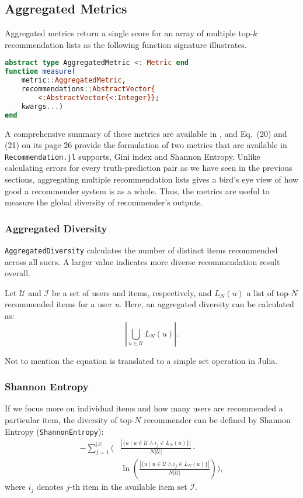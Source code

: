 \subsection{Aggregated Metrics}

Aggregated metrics return a single score for an array of multiple top-$k$ recommendation lists as the following function signature illustrates. 

\begin{lstlisting}[language = Julia]
abstract type AggregatedMetric <: Metric end
function measure(
    metric::AggregatedMetric, 
    recommendations::AbstractVector{
        <:AbstractVector{<:Integer}}; 
    kwargs...)
end
\end{lstlisting}

A comprehensive summary of these metrics are available in \cite{shani2011evaluating}, and Eq.~(20) and (21) on its page 26 provide the formulation of two metrics that are available in \texttt{Recommendation.jl} supports, Gini index and Shannon Entropy. Unlike calculating errors for every truth-prediction pair as we have seen in the previous sections, aggregating multiple recommendation lists gives a bird's eye view of how good a recommender system is as a whole. Thus, the metrics are useful to measure the global diversity of recommender's outputs.

\subsubsection{Aggregated Diversity}

\texttt{AggregatedDiversity} calculates the number of distinct items recommended across all suers. A larger value indicates more diverse recommendation result overall.

Let $\mathcal{U}$ and $\mathcal{I}$ be a set of users and items, respectively, and $L_N(u)$ a list of top-$N$ recommended items for a user $u$. Here, an aggregated diversity can be calculated as:
\begin{equation*}
\left| \bigcup\limits_{u \in \mathcal{U}} L_N(u) \right|.
\end{equation*}

Not to mention the equation is translated to a simple set operation in Julia.

\subsubsection{Shannon Entropy}

If we focus more on individual items and how many users are recommended a particular item, the diversity of top-$N$ recommender can be defined by Shannon Entropy (\texttt{ShannonEntropy}):
\begin{align*}
-\sum_{j = 1}^{|\mathcal{I}|} \Bigg( & \frac{\left|\{u \mid u \in \mathcal{U} \wedge i_j \in L_N(u) \}\right|}{N |\mathcal{U}|} \cdot \\ 
& \ln \left( \frac{\left|\{u \mid u \in \mathcal{U} \wedge i_j \in L_N(u) \}\right|}{N |\mathcal{U}|}  \right) \Bigg),
\end{align*}
where $i_j$ denotes $j$-th item in the available item set $\mathcal{I}$.

